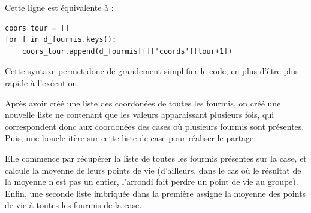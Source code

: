 \documentclass[a4paper,12pt]{article}
\begin{document}
Cette ligne est équivalente à :

\begin{verbatim}
coors_tour = []
for f in d_fourmis.keys():
    coors_tour.append(d_fourmis[f]['coords'][tour+1])
\end{verbatim}

Cette syntaxe permet donc de grandement simplifier le code, en plus d'être plus rapide à l'exécution.

Après avoir créé une liste des coordonées de toutes les fourmis, on créé une nouvelle liste ne contenant que les valeurs apparaissant plusieurs fois, qui correspondent donc aux coordonées des cases où plusieurs fourmis sont présentes. Puis, une boucle itère sur cette liste de case pour réaliser le partage.

Elle commence par récupérer la liste de toutes les fourmis présentes sur la case, et calcule la moyenne de leurs points de vie (d'ailleurs, dans le cas où le résultat de la moyenne n'est pas un entier, l'arrondi fait perdre un point de vie au groupe). Enfin, une seconde liste imbriquée dans la première assigne la moyenne des points de vie à toutes les fourmis de la case.
\end{document}

